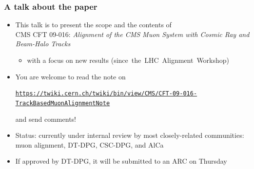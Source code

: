 \documentclass[compress]{beamer}
\begin{document}
\begin{frame}
\frametitle{A talk about the paper}
\begin{itemize}\setlength{\itemsep}{0.25 cm}
\item This talk is to present the scope and the contents of \\ CMS CFT
  09-016: {\it Alignment of the CMS Muon System with Cosmic Ray and
    Beam-Halo Tracks}
\begin{itemize}
\item with a focus on new results \mbox{(since the LHC Alignment Workshop)\hspace{-1 cm}}
\end{itemize}

\item You are welcome to read the note on

\textcolor{blue}{\tt \tiny \underline{\href{https://twiki.cern.ch/twiki/bin/view/CMS/CFT-09-016-TrackBasedMuonAlignmentNote}{https://twiki.cern.ch/twiki/bin/view/CMS/CFT-09-016-TrackBasedMuonAlignmentNote}}}

and send comments!

\item Status: currently under internal review by most closely-related communities: muon alignment, DT-DPG, CSC-DPG, and AlCa

\item If approved by DT-DPG, it will be submitted to an ARC on Thursday
\end{itemize}
\end{frame}
\end{document}
